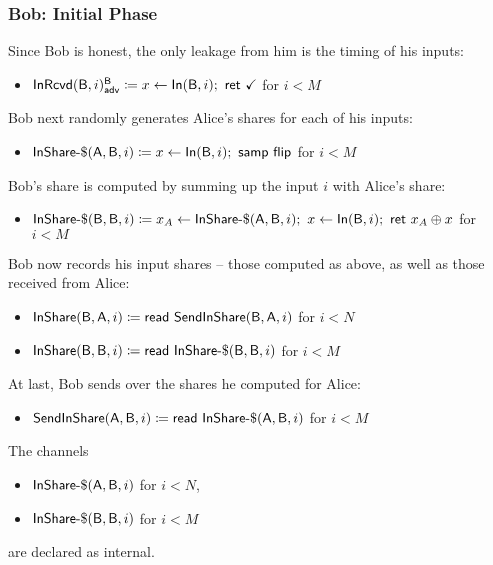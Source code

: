 \subsubsection{Bob: Initial Phase}
Since Bob is honest, the only leakage from him is the timing of his inputs:
\begin{itemize}
\item {\color{blue} $\mathsf{InRcvd}(\mathsf{B},i)^{\mathsf{B}}_{\mathsf{adv}} \coloneqq x \leftarrow \mathsf{In}(\mathsf{B},i); \ \mathsf{ret} \ \checkmark$ for $i < M$}
\end{itemize}
Bob next randomly generates Alice's shares for each of his inputs:
\begin{itemize}
\item $\mathsf{InShare}\textsf{-}\$(\mathsf{A},\mathsf{B},i) \coloneqq x \leftarrow \mathsf{In}(\mathsf{B},i); \ \mathsf{samp} \ \mathsf{flip}$ for $i < M$
\end{itemize}
Bob's share is computed by summing up the input $i$ with Alice's share:
\begin{itemize}
\item $\mathsf{InShare}\textsf{-}\$(\mathsf{B},\mathsf{B},i) \coloneqq x_A \leftarrow \mathsf{InShare}\textsf{-}\$(\mathsf{A},\mathsf{B},i); \ x \leftarrow \mathsf{In}(\mathsf{B},i); \ \mathsf{ret} \ x_A \oplus x$ for $i < M$
\end{itemize}
Bob now records his input shares -- those computed as above, as well as those received from Alice:
\begin{itemize}
\item $\mathsf{InShare}(\mathsf{B},\mathsf{A},i) \coloneqq \mathsf{read} \ \mathsf{SendInShare}(\mathsf{B},\mathsf{A},i)$ for $i < N$
\item $\mathsf{InShare}(\mathsf{B},\mathsf{B},i) \coloneqq \mathsf{read} \ \mathsf{InShare}\textsf{-}\$(\mathsf{B},\mathsf{B},i)$ for $i < M$
\end{itemize}
At last, Bob sends over the shares he computed for Alice:
\begin{itemize}
\item $\mathsf{SendInShare}(\mathsf{A},\mathsf{B},i) \coloneqq \mathsf{read} \ \mathsf{InShare}\textsf{-}\$(\mathsf{A},\mathsf{B},i)$ for $i < M$
\end{itemize}
The channels
\begin{itemize}
\item $\mathsf{InShare}\textsf{-}\$(\mathsf{A},\mathsf{B},i)$ for $i < N$,
\item $\mathsf{InShare}\textsf{-}\$(\mathsf{B},\mathsf{B},i)$ for $i < M$
\end{itemize}
are declared as internal.

